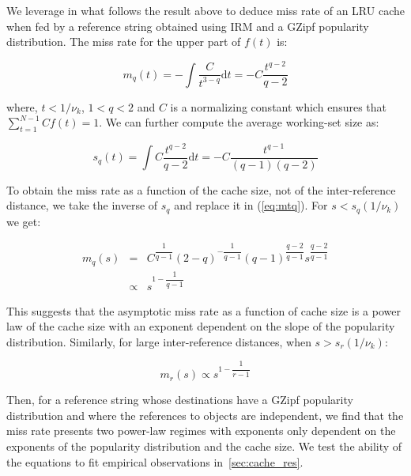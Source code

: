 \documentclass[twocolumn, 10pt]{article}
\theoremstyle{plain}
\begin{document}
We leverage in what follows the result above to deduce miss rate of an LRU
cache when fed by a reference string obtained using IRM and a GZipf popularity
distribution. The miss rate for the upper part of $f(t)$ is:

\begin{equation}
    m_q(t) = - \int \dfrac{C}{t^{3-q}} \mathrm{d}t = - C \dfrac{t^{q-2}}{q-2}
    \label{eq:mtq}
\end{equation}

\noindent where, $t < 1/\nu_k$, $1<q<2$ and $C$ is a normalizing constant
which ensures that $\sum\limits_{t=1}^{N-1} C f(t) = 1$. We can further
compute the average working-set size as:

\begin{equation}
    s_q(t) =  \int C\dfrac{t^{q-2}}{q-2} \mathrm{d}t = -C
    \dfrac{t^{q-1}}{(q-1)(q-2)}
    \label{eq:stq}
\end{equation}

To obtain the miss rate as a function of the cache size, not of the
inter-reference distance, we take the inverse of $s_q$ and replace it in
(\ref{eq:mtq}). For $s < s_q(1/\nu_k)$ we get:

\begin{eqnarray}
    m_q(s) &=& C^{\dfrac{1}{q-1}} (2-q)^{-\dfrac{1}{q-1}}
    (q-1)^{\dfrac{q-2}{q-1}} s^{\dfrac{q-2}{q-1}} \nonumber \\
            &\propto& s^{1-\dfrac{1}{q-1}}
    \label{eq:msq}
\end{eqnarray}

This suggests that the asymptotic miss rate as a function of cache size is a
power law of the cache size with an exponent dependent on the slope of the
popularity distribution. Similarly, for large inter-reference distances, when
$s>s_r(1/\nu_k)$:

\begin{equation}
     m_r(s) \propto s^{1-\dfrac{1}{r-1}}
    \label{eq:msr}
\end{equation}

Then, for a reference string whose destinations have a GZipf popularity distribution
and where the references to objects are independent, we find that the miss
rate presents two power-law regimes with exponents only dependent on the
exponents of the popularity distribution and the cache size. We test the ability of the
equations to fit empirical observations in~\ref{sec:cache_res}.
\end{document}
